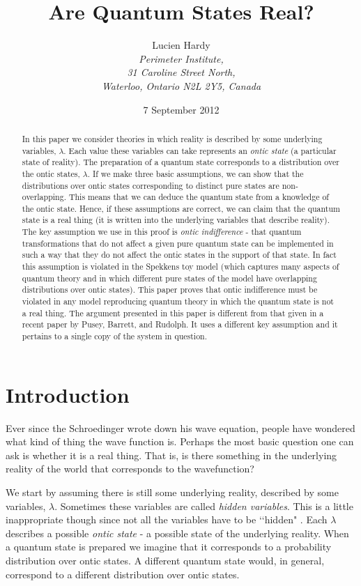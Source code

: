 \documentclass[12pt]{article}
\title{\Large \textbf{Are Quantum States Real?}}
\author{\normalsize Lucien Hardy\\[-2pt] \normalsize\textit{Perimeter Institute,}\\[-2pt] \normalsize\textit{31 Caroline Street North,}\\[-2pt] \normalsize\textit{Waterloo, Ontario N2L 2Y5, Canada}}
\date{\normalsize 7 September 2012}
\begin{document}
\maketitle


\begin{abstract} In this paper we consider theories in which reality is described by some underlying variables, $\lambda$.  Each
value these variables can take represents an \emph{ontic state} (a particular state of reality). The preparation of a quantum state corresponds to a distribution over the ontic states,
$\lambda$.   If we make three basic assumptions, we can show that the distributions over ontic states corresponding to distinct pure states are non-overlapping.  This means that we can deduce the quantum state from a knowledge of the ontic state. Hence, if these assumptions are correct, we can claim that the quantum state is a real thing (it is written into the underlying variables that describe reality).  The key assumption we use in this proof is \emph{ontic indifference} - that quantum transformations that do not affect a given pure quantum state can be implemented in such a way that they do not affect the ontic states in the support of that state.  In fact this assumption is violated in the Spekkens toy model (which captures many aspects of quantum theory and in which different pure states of the model have overlapping distributions over ontic states).   This paper proves that ontic indifference must be violated in any model reproducing quantum theory in which the quantum state is not a real thing.  The argument presented in this paper is different from that given in a recent paper by Pusey, Barrett, and Rudolph.  It uses a different key assumption and it pertains to a single copy of the system in question.
\end{abstract}

\newpage

\section{Introduction} \label{introduction}

Ever since the Schroedinger wrote down his wave equation, people have wondered what kind of thing the wave function is.  Perhaps the most basic question one can ask is whether it is a real
thing.  That is, is there something in the underlying reality of the world that corresponds to the wavefunction?

We start by assuming there is still some underlying reality, described by some variables, $\lambda$.  Sometimes these variables are called \emph{hidden variables}.  This is a little
inappropriate though since not all the variables have to be \lq\lq hidden" \cite{bell2004speakable}.  Each $\lambda$ describes a possible \emph{ontic state} - a possible state of the
underlying reality.  When a quantum state is prepared we imagine that it corresponds to a probability distribution over ontic states.  A different quantum state would, in general, correspond
to a different distribution over ontic states.
\end{document}
